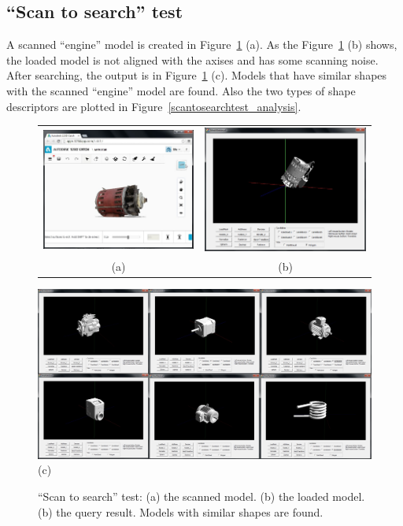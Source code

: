 \subsection{``Scan to search'' test}

A scanned ``engine'' model is created in Figure~\ref{scantosearchtest_UI} (a). As the Figure~\ref{scantosearchtest_UI} (b) shows, the loaded model is not aligned with the axises and has some scanning noise. After searching, the output is in Figure~\ref{scantosearchtest_UI} (c). Models that have similar shapes with the scanned ``engine'' model are found. Also the two types of shape descriptors are plotted in Figure~\ref{scantosearchtest_analysis}. 

\begin{figure}
\begin{center}
\begin{tabular}{cc}   %
   \includegraphics[height=0.35\columnwidth]{input_scanned_scantosearch_test}& 
   \includegraphics[height=0.35\columnwidth]{input_scantosearch_test}\\
   (a) & (b)\\
\end{tabular}
   \includegraphics[width=1\linewidth]{output_scantosearch_test}  \\
   (c) \\
\caption{``Scan to search'' test: (a) the scanned model. (b) the loaded model. (b) the query result. Models with similar shapes are found. } 
  \label{scantosearchtest_UI}
\end{center}
\end{figure}

